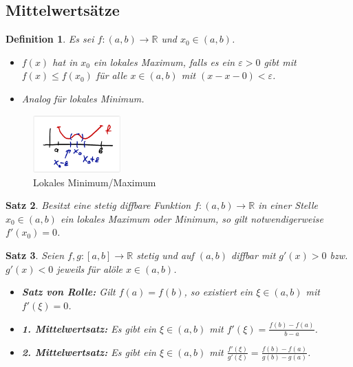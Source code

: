 \documentclass[12pt,a4paper]{article}%
\newtheorem{satz}{Satz}[section]
\newtheorem{definition}[satz]{Definition}
\numberwithin{equation}{section}
\newcommand{\R}{\mathbb{R}} %
\numberwithin{equation}{subsection}
\begin{document}
  \subsection{Mittelwertsätze}  
  \begin{definition}
    Es sei $f:(a,b)\rightarrow \R$ und $x_0 \in (a,b)$.
    \begin{itemize}
      \item[a) ]$f(x)$ hat in $x_0$ ein lokales Maximum, falls es ein $\varepsilon > 0$ gibt mit $f(x) \leq f(x_0)$ für alle $x \in (a,b)$ mit $(x-x-0) < \varepsilon$.
      \item[b) ] Analog für lokales Minimum. 
    \end{itemize}
  \end{definition}
  \vspace{-0.5cm}
	  \begin{figure}[H]
	  \centering
	  \includegraphics[width=0.3\textwidth]{mws_def.png}
	  \caption{Lokales Minimum/Maximum\protect\cite{HM12}}
	  \label{fig:mws_min_max}
	\end{figure}
  \begin{satz}
    Besitzt eine stetig diffbare Funktion $f: (a,b) \rightarrow \R$ in einer Stelle $x_0 \in (a,b)$ ein lokales Maximum oder Minimum, so gilt notwendigerweise $f'(x_0) = 0$.
  \end{satz}
  \begin{satz}
    Seien $f,g:[a,b] \rightarrow \R$ stetig und auf $(a,b)$ diffbar mit $g'(x) > 0$ bzw. $g'(x) <0$ jeweils für alöle $x \in (a,b)$. 
    \begin{itemize}
      \item[a) ] \textbf{Satz von Rolle:} Gilt $f(a) = f(b)$, so existiert ein $\xi \in (a,b)$ mit $f'(\xi) = 0$.
      \item[b) ] \textbf{1. Mittelwertsatz:} Es gibt ein $\xi \in (a,b)$ mit $f'(\xi) = \frac{f(b) - f(a)}{b-a}$.
      \item[c) ] \textbf{2. Mittelwertsatz:} Es gibt ein $\xi \in (a,b)$ mit $\frac{f'(\xi)}{g'(\xi)} = \frac{f(b) - f(a)}{g(b) - g(a)}$.
    \end{itemize}
  \end{satz}
\end{document}
